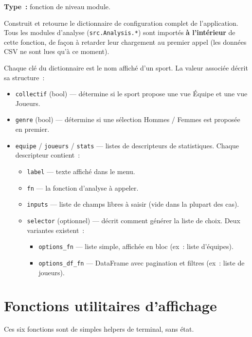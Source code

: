 \documentclass[12pt,a4paper]{article}
\begin{document}
\textbf{Type~:} fonction de niveau module.

Construit et retourne le dictionnaire de configuration complet de
l'application. Tous les modules d'analyse (\texttt{src.Analysis.*})
sont importés \textbf{à l'intérieur} de cette fonction, de façon à
retarder leur chargement au premier appel (les données CSV ne sont
lues qu'à ce moment).

Chaque clé du dictionnaire est le nom affiché d'un sport. La valeur
associée décrit sa structure~:

\begin{itemize}
    \item \texttt{collectif} (bool) — détermine si le sport propose
    une vue Équipe et une vue Joueurs.
    \item \texttt{genre} (bool) — détermine si une sélection
    Hommes / Femmes est proposée en premier.
    \item \texttt{equipe} / \texttt{joueurs} / \texttt{stats} — listes
    de descripteurs de statistiques. Chaque descripteur contient~:
    \begin{itemize}
        \item \texttt{label} — texte affiché dans le menu.
        \item \texttt{fn} — la fonction d'analyse à appeler.
        \item \texttt{inputs} — liste de champs libres à saisir (vide
        dans la plupart des cas).
        \item \texttt{selector} (optionnel) — décrit comment générer
        la liste de choix. Deux variantes existent~:
        \begin{itemize}
            \item \texttt{options\_fn} — liste simple, affichée en
            bloc (ex~: liste d'équipes).
            \item \texttt{options\_df\_fn} — DataFrame avec pagination
            et filtres (ex~: liste de joueurs).
        \end{itemize}
    \end{itemize}
\end{itemize}

\section{Fonctions utilitaires d'affichage}

Ces six fonctions sont de simples helpers de terminal, sans état.
\end{document}
